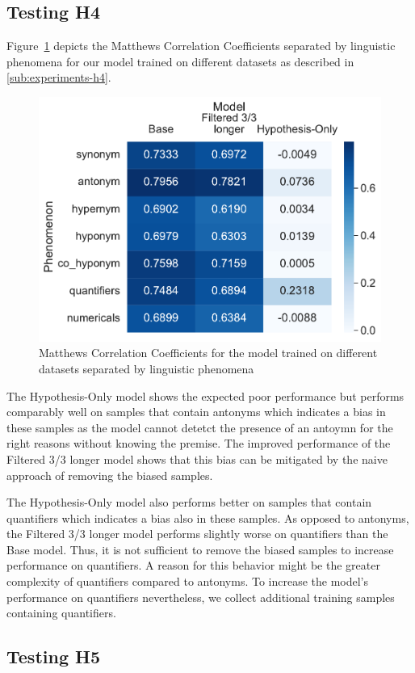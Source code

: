 \subsection{Testing H4}
Figure~\ref{fig:metric-heatmap-phenomena-mcc} depicts the Matthews Correlation Coefficients separated by linguistic phenomena for our model trained on different datasets as described in \autoref{sub:experiments-h4}.

\begin{figure}[ht]
    \centering
    \includegraphics[width=0.9\columnwidth]{./images/metric_heatmaps_phenomena/important_words/matthews_correlation.pdf}
    \caption{Matthews Correlation Coefficients for the model trained on different datasets separated by linguistic phenomena}
    \label{fig:metric-heatmap-phenomena-mcc}
\end{figure}

The Hypothesis-Only model shows the expected poor performance but performs comparably well on samples that contain antonyms which indicates a bias in these samples as the model cannot detetct the presence of an antoymn for the right reasons without knowing the premise. The improved performance of the Filtered 3/3 longer model shows that this bias can be mitigated by the naive approach of removing the biased samples.

The Hypothesis-Only model also performs better on samples that contain quantifiers which indicates a bias also in these samples. As opposed to antonyms, the Filtered 3/3 longer model performs slightly worse on quantifiers than the Base model. Thus, it is not sufficient to remove the biased samples to increase performance on quantifiers. A reason for this behavior might be the greater complexity of quantifiers compared to antonyms. To increase the model's performance on quantifiers nevertheless, we collect additional training samples containing quantifiers.

\subsection{Testing H5}
